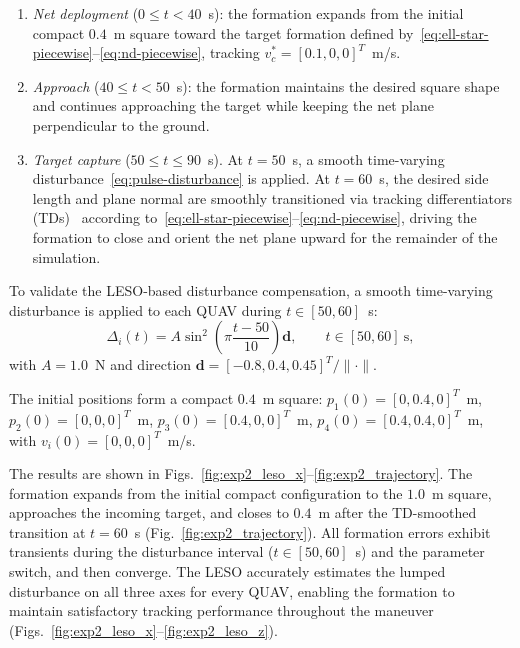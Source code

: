 \documentclass[letterpaper,journal]{IEEEtran}
\theoremstyle{plain}
\theoremstyle{definition}
\theoremstyle{remark}
\begin{document}
\begin{enumerate}[leftmargin=*,nosep]
\item \emph{Net deployment} (\(0\le t<40\)~s): the formation expands from the initial compact \(0.4\)~m square toward the target formation defined by~\eqref{eq:ell-star-piecewise}--\eqref{eq:nd-piecewise}, tracking \(v_c^*=[0.1,0,0]^{T}\)~m/s.
\item \emph{Approach} (\(40\le t<50\)~s): the formation maintains the desired square shape and continues approaching the target while keeping the net plane perpendicular to the ground.
\item \emph{Target capture} (\(50\le t\le 90\)~s). At \(t=50\)~s, a smooth time-varying disturbance~\eqref{eq:pulse-disturbance} is applied. At \(t=60\)~s, the desired side length and plane normal are smoothly transitioned via tracking differentiators (TDs)~\cite{han2009PIDtoADRC} according to~\eqref{eq:ell-star-piecewise}--\eqref{eq:nd-piecewise}, driving the formation to close and orient the net plane upward for the remainder of the simulation.
\end{enumerate}

To validate the LESO-based disturbance compensation, a smooth time-varying disturbance is applied to each QUAV during \(t\in[50,60]\)~s:
\begin{equation}
\Delta_i(t)=A\sin^{2}\!\left(\pi\frac{t-50}{10}\right)\mathbf{d},\qquad t\in[50,60]~\mathrm{s},
\label{eq:pulse-disturbance}
\end{equation}
with \(A=1.0\)~N and direction \(\mathbf{d}=[-0.8,0.4,0.45]^{T}/\|\cdot\|\).

The initial positions form a compact \(0.4\)~m square: \(p_1(0)=[0,0.4,0]^{T}\)~m, \(p_2(0)=[0,0,0]^{T}\)~m, \(p_3(0)=[0.4,0,0]^{T}\)~m, \(p_4(0)=[0.4,0.4,0]^{T}\)~m, with \(v_i(0)=[0,0,0]^{T}\)~m/s.

The results are shown in Figs.~\ref{fig:exp2_leso_x}--\ref{fig:exp2_trajectory}. The formation expands from the initial compact configuration to the \(1.0\)~m square, approaches the incoming target, and closes to \(0.4\)~m after the TD-smoothed transition at \(t=60\)~s (Fig.~\ref{fig:exp2_trajectory}). All formation errors exhibit transients during the disturbance interval (\(t\in[50,60]\)~s) and the parameter switch, and then converge. The LESO accurately estimates the lumped disturbance on all three axes for every QUAV, enabling the formation to maintain satisfactory tracking performance throughout the maneuver (Figs.~\ref{fig:exp2_leso_x}--\ref{fig:exp2_leso_z}).
\end{document}
